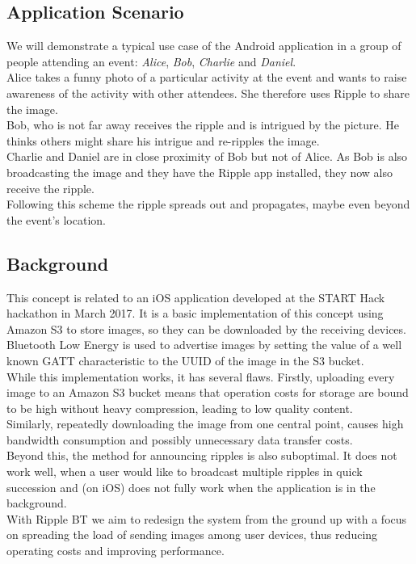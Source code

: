 \documentclass{report}
\begin{document}
\subsection{Application Scenario}
We will demonstrate a typical use case of the Android application in a group of people attending an event: \textit{Alice}, \textit{Bob}, \textit{Charlie} and \textit{Daniel}.\\
Alice takes a funny photo of a particular activity at the event and wants to raise awareness of the activity with other attendees. She therefore uses Ripple to share the image.\\
Bob, who is not far away receives the ripple and is intrigued by the picture. He thinks others might share his intrigue and re-ripples the image.\\
Charlie and Daniel are in close proximity of Bob but not of Alice. As Bob is also broadcasting the image and they have the Ripple app installed, they now also receive the ripple.\\
Following this scheme the ripple spreads out and propagates, maybe even beyond the event's location.

\subsection{Background}
This concept is related to an iOS application developed at the START Hack hackathon in March 2017. It is a basic implementation of this concept using Amazon S3 to store images, so they can be downloaded by the receiving devices. Bluetooth Low Energy is used to advertise images by setting the value of a well known GATT characteristic to the UUID of the image in the S3 bucket.\\
While this implementation works, it has several flaws. Firstly, uploading every image to an Amazon S3 bucket means that operation costs for storage are bound to be high without heavy compression, leading to low quality content.\\
Similarly, repeatedly downloading the image from one central point, causes high bandwidth consumption and possibly unnecessary data transfer costs.\\
Beyond this, the method for announcing ripples is also suboptimal. It does not work well, when a user would like to broadcast multiple ripples in quick succession and (on iOS) does not fully work when the application is in the background.\\
With Ripple BT we aim to redesign the system from the ground up with a focus on spreading the load of sending images among user devices, thus reducing operating costs and improving performance.
\end{document}
